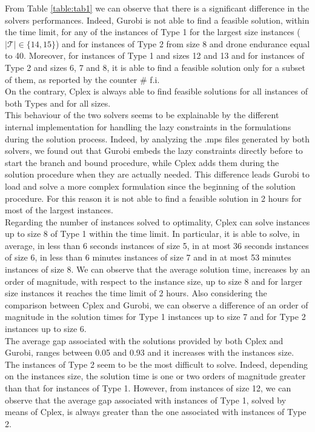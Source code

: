 \noindent


From Table \ref{table:tab1} we can observe that there is a significant difference in the solvers performances. Indeed, Gurobi is not able to find a feasible solution, within the time limit,  for any of  the instances of Type 1 for the largest size instances ($|\mathcal{T}|\in \{14,15\}$)  and for instances of Type 2 from size 8 and drone endurance equal to 40. Moreover, for instances of Type 1 and sizes 12 and 13 and for instances of Type 2 and sizes 6, 7 and 8, it is able to find a feasible solution only for a subset of them, as reported by the counter $\#$ f.i.\\
On the contrary, Cplex is always able to find  feasible solutions for all instances of both Types and for all sizes.\\
\indent This behaviour of the two solvers seems to be explainable by the different internal implementation for handling the lazy constraints in the formulations during the solution process. Indeed, by analyzing the .mps files generated by both solvers, we found out that Gurobi embeds the lazy constraints directly before to start  the branch and bound procedure, while Cplex adds them during the solution procedure when they are actually needed. This difference leads Gurobi to load and solve a more complex formulation since the beginning of the solution procedure. For this reason it is not able to find a feasible solution in 2 hours for most of the largest instances.\\
\indent Regarding the number of instances solved to optimality, Cplex can solve instances up to size 8 of Type 1 within the time limit. In particular, it is able to solve, in average, in less than 6 seconds instances of size 5, in at most 36 seconds instances of size 6, in less than 6 minutes instances of size 7 and in at most 53 minutes instances of size 8. We can observe that the average solution time, increases by an order of magnitude, with respect to the instance size,  up to size 8 and for larger size instances it reaches the time limit of 2 hours. Also considering the comparison between Cplex and Gurobi, we can observe a difference of an order of magnitude in the solution times for Type 1 instances up to size 7 and for Type 2 instances up to size 6.\\
The average gap associated with the solutions provided by both Cplex and Gurobi, ranges between 0.05 and 0.93 and it increases with the instances size. The instances of Type 2 seem to be the most difficult to solve. Indeed, depending on the instances size, the solution time is one or two orders of magnitude greater than that for instances of Type 1. However, from instances of size 12, we can observe that the average gap associated with instances of Type 1, solved by means of Cplex, is always greater than the one associated with instances of Type 2.





